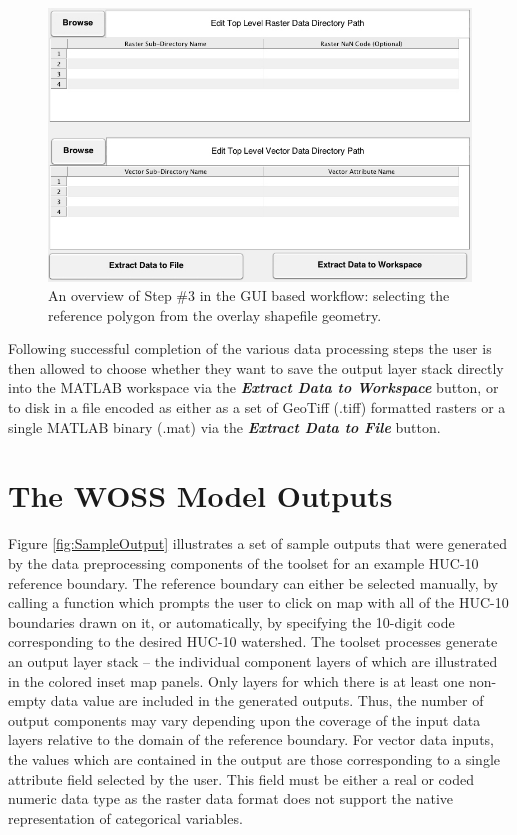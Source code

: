          \begin{figure}[!h]
            \includegraphics[width=5.5in]{figures/gui_fig3.jpg}
            \caption{An overview of Step \#3 in the GUI based workflow: selecting the reference polygon from the overlay shapefile geometry.}
            \label{fig:GUIpart3}
         \end{figure}
         
Following successful completion of the various data processing steps the user is then allowed to choose whether they want to save the output layer stack directly into the MATLAB workspace via the \textit{\textbf{Extract Data to Workspace}} button, or to disk in a file encoded as either as a set of GeoTiff (.tiff) formatted rasters or a single MATLAB binary (.mat) via the \textit{\textbf{Extract Data to File}} button.
    
\section{The WOSS Model Outputs}
    
Figure \ref{fig:SampleOutput} illustrates a set of sample outputs that were generated by the data preprocessing components of the toolset for an example HUC-10 reference boundary. The reference boundary can either be selected manually, by calling a function which prompts the user to click on map with all of the HUC-10 boundaries drawn on it, or automatically, by specifying the 10-digit code corresponding to the desired HUC-10 watershed. The toolset processes generate an output layer stack -- the individual component layers of which are illustrated in the colored inset map panels. Only layers for which there is at least one non-empty data value are included in the generated outputs. Thus, the number of output components may vary depending upon the coverage of the input data layers relative to the domain of the reference boundary. For vector data inputs, the values which are contained in the output are those corresponding to a single attribute field selected by the user. This field must be either a real or coded numeric data type as the raster data format does not support the native representation of categorical variables.
    
